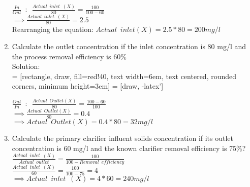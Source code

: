 \documentclass{article}
\begin{document}
\begin{enumerate}
$\frac{In}{Out} \enspace : \enspace \frac{Actual \enspace inlet \enspace  (X)}{80}=\frac{100}{100-60}$\\
$\implies \frac{Actual \enspace inlet \enspace  (X)}{80}=2.5$\\    
Rearranging the equation:   $Actual \enspace inlet (X)=2.5*80 = \boxed{200 mg/l}$\\

\item Calculate the outlet concentration if the inlet concentration is 80 mg/l and the process removal efficiency is 60\%\\
Solution:\\

 = [rectangle, draw, fill=red!40, 
    text width=6em, text centered, rounded corners, minimum height=3em]
 = [draw, -latex']
\begin{figure}[!h]
\centering
{}
\end{figure}
\vspace{0cm}
$\frac{Out}{In} \enspace:\enspace\frac{Actual \enspace Outlet (X)}{80}=\frac{100-60}{100}$\\
$\implies \frac{Actual \enspace Outlet (X)}{80} =0.4$\\
$\implies Actual \enspace  Outlet (X) = 0.4 * 80 = \boxed{32 mg/l}$\\

\item Calculate the primary clarifier influent solids concentration if its outlet concentration is 60 mg/l and the known clarifier removal efficiency is 75\%?\\
$\frac{Actual \enspace  inlet \enspace (X)}{Actual \enspace outlet}=\frac{100}{100-Removal \enspace efficiency}$\\ 
$\frac{Actual \enspace  inlet \enspace (X)}{60}=\frac{100}{100-75}=4$\\
$\implies Actual \enspace inlet \enspace (X)=4*60 = \boxed{240 mg/l}$\\


\end{enumerate}
\end{document}
